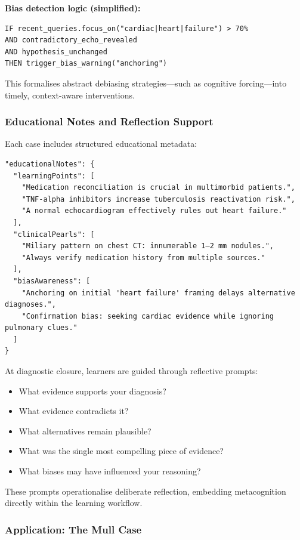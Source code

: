 \noindent
\textbf{Bias detection logic (simplified):}

\begin{verbatim}
IF recent_queries.focus_on("cardiac|heart|failure") > 70%
AND contradictory_echo_revealed
AND hypothesis_unchanged
THEN trigger_bias_warning("anchoring")
\end{verbatim}

This formalises abstract debiasing strategies—such as cognitive forcing—into
timely, context-aware interventions.

\subsubsection{Educational Notes and Reflection Support}

Each case includes structured educational metadata:

\begin{verbatim}
"educationalNotes": {
  "learningPoints": [
    "Medication reconciliation is crucial in multimorbid patients.",
    "TNF-alpha inhibitors increase tuberculosis reactivation risk.",
    "A normal echocardiogram effectively rules out heart failure."
  ],
  "clinicalPearls": [
    "Miliary pattern on chest CT: innumerable 1–2 mm nodules.",
    "Always verify medication history from multiple sources."
  ],
  "biasAwareness": [
    "Anchoring on initial 'heart failure' framing delays alternative diagnoses.",
    "Confirmation bias: seeking cardiac evidence while ignoring pulmonary clues."
  ]
}
\end{verbatim}

At diagnostic closure, learners are guided through reflective prompts:

\begin{itemize}
  \item What evidence supports your diagnosis?
  \item What evidence contradicts it?
  \item What alternatives remain plausible?
  \item What was the single most compelling piece of evidence?
  \item What biases may have influenced your reasoning?
\end{itemize}

These prompts operationalise deliberate reflection, embedding metacognition
directly within the learning workflow.

\subsubsection{Application: The Mull Case}

